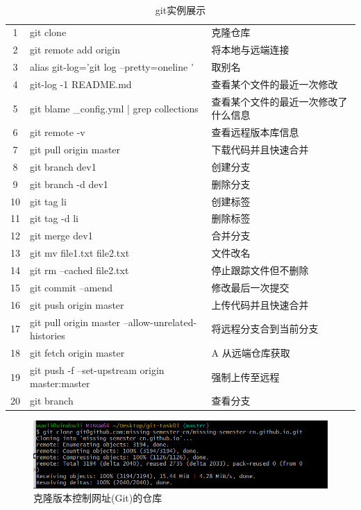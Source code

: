 \documentclass[a4paper, 12pt]{article}
\begin{document}
 
  \\
   
  
\begin{table}[H]
\centering
\caption{ {\color{red}git实例展示}}
\begin{tabular}{cll}
1&git clone &克隆仓库    \\
2&git remote add origin & 将本地与远端连接    \\
3&alias git-log='git log --pretty=oneline ' &  取别名   \\
4& git-log -1 README.md &  查看某个文件的最近一次修改   \\
5&git blame _config.yml | grep collections &   查看某个文件的最近一次修改了什么信息  \\
6&git remote -v &   查看远程版本库信息  \\
7&git pull origin master &  下载代码并且快速合并   \\
8&git branch dev1 &  创建分支   \\
9&git branch -d dev1 &    删除分支 \\
10&git tag li &   创建标签  \\
 11& git tag -d li& 删除标签   \\
 12&git merge dev1 & 合并分支   \\
 13&git mv file1.txt file2.txt & 文件改名  \\
 14&git rm --cached file2.txt & 停止跟踪文件但不删除  \\
 15& git commit --amend& 修改最后一次提交   \\
 16&git push origin master & 上传代码并且快速合并  \\
 17&git pull origin master --allow-unrelated-histories & 将远程分支合到当前分支   \\
 18&git fetch origin master & A  从远端仓库获取 \\
 19&git push -f --set-upstream origin master:master &  强制上传至远程  \\
 20&git branch & 查看分支 
\end{tabular}
\end{table}


  \begin{figure}[H]
  \centering
  \includegraphics[width=1\textwidth]{屏幕截图 2024-08-28 164453.png}
  \caption{克隆版本控制网址(Git)的仓库}
    \end{figure}
\end{document}
